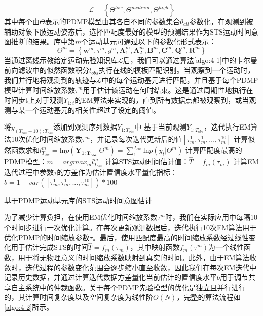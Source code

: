 \begin{equation}
    \mathscr{L}=\left\{\Theta^{low}, \Theta^{medium}, \Theta^{high}\right\}
\end{equation}
其中每个由$\Theta$表示的PDMP模型由其各自不同的参数集合$\theta_{all}$参数化，在观测到被辅助对象下肢运动姿态后，选择匹配度最好的模型的预测结果作为STS运动时间意图推断的结果。库中第$m$个运动基元可通过以下的参数化形式表示：
\begin{equation}
    \Theta ^{m}=\left\{\mathbf{w}^{m}, \tau^{m}, g^{m}, \mathbf{A}_1^{m}, \mathbf{A}_2^{m}, \mathbf{B}^{m}, \mathbf{C}^{m}, \mathbf{Q}^{m}, \mathbf{R}^{m}\right\}
\end{equation}
当通过离线示教给定运动先验知识库$\mathscr{L}$后，我们可以通过算法\ref{algo:4-1}中的卡尔曼前向滤波中的似然函数积分$l_{obs}$执行在线的模板匹配识别。当观察到一个运动时，我们并行地将观测到的轨迹与$\mathscr{L}$中的每个运动基元进行匹配，并且基于每个PDMP模型计算时间缩放系数$\tau^{m}$用于估计该运动在何时结束。这是通过周期性地执行在时间步t上对于观测$Y_{1:t}$的EM算法来实现的，直到所有数据点都被观察到，或当观测与某一个运动基元的相关性超过了设定的阈值。
\begin{algorithm}[htb]
    \SetAlgoLined
    {
        将$y_{{(T_{obs}-10)}:T_{obs}}$添加到观测序列数据$Y_{1:T_{obs}}$中 \;
        {
            基于当前观测$Y_{1:T_{obs}}$，迭代执行EM算法10次优化时间缩放系数$\tau^m$，并记录每次迭代更新后的值$[\tau_m^1,\tau_m^1,...,\tau_m^{10}]$\;
            计算似然函数求和$l_{T_{obs}}^m=\text{ln}p(\mathbf{Y_{1:T_{obs}}}|\Theta ^{m})=\sum_{1}^{T_{obs}} \text{ln}p(y_t|\Theta ^{m})$ \;
        }
        计算匹配度最高的PDMP模型：$m=argmax_m l_{T_{obs}}^m$\;
        计算STS运动时间估计值：$\hat T = f_m(\tau_m)$\;
        计算EM迭代过程中参数$\tau$的方差作为估计置信度水平量化指标：$b = 1 - var([\tau_m^1,\tau_m^1,...,\tau_m^{10}]) * 100$\;
    }
    \caption{基于PDMP运动基元库的STS运动时间意图估计}
    \label{algo:4-2}
\end{algorithm}

为了减少计算负担，在使用EM优化时间缩放系数$\tau^{m}$时，我们在实际应用中每隔10个时间步进行一次优化计算。在每次更新观测数据后，迭代执行10次EM算法用于优化PDMP的时间缩放参数$\tau$。最后，使用匹配度最高的时间缩放系数经过线性变化用于估计完成STS的时间$\hat T=f_m(\tau_m)$，其中映射函数$f_m(\tau^m)$为一个线性函数，用于将无物理意义的时间缩放系数映射到真实的时间。此外，由于EM算法收敛时，迭代过程的参数变化范围会逐步缩小直至收敛，因此我们在每次EM迭代中记录历史数据，并通过计算迭代数据方差量化当前估计的置信度水平$b$用于调节共享自主系统中的仲裁函数。关于每个PDMP先验模型的优化是独立且并行进行的，其计算时间复杂度以及空间复杂度为线性阶$O(N)$，完整的算法流程如\ref{algo:4-2}所示。


